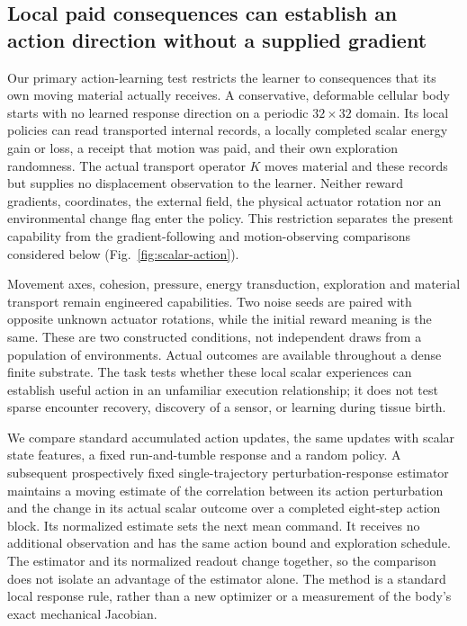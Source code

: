 \subsection*{Local paid consequences can establish an action direction without a supplied gradient}

Our primary action-learning test restricts the learner to consequences that its own moving material actually receives. A conservative, deformable cellular body starts with no learned response direction on a periodic $32\times32$ domain. Its local policies can read transported internal records, a locally completed scalar energy gain or loss, a receipt that motion was paid, and their own exploration randomness. The actual transport operator $K$ moves material and these records but supplies no displacement observation to the learner. Neither reward gradients, coordinates, the external field, the physical actuator rotation nor an environmental change flag enter the policy. This restriction separates the present capability from the gradient-following and motion-observing comparisons considered below (Fig.~\ref{fig:scalar-action}).

Movement axes, cohesion, pressure, energy transduction, exploration and material transport remain engineered capabilities. Two noise seeds are paired with opposite unknown actuator rotations, while the initial reward meaning is the same. These are two constructed conditions, not independent draws from a population of environments. Actual outcomes are available throughout a dense finite substrate. The task tests whether these local scalar experiences can establish useful action in an unfamiliar execution relationship; it does not test sparse encounter recovery, discovery of a sensor, or learning during tissue birth.

We compare standard accumulated action updates, the same updates with scalar state features, a fixed run-and-tumble response and a random policy. A subsequent prospectively fixed single-trajectory perturbation-response estimator maintains a moving estimate of the correlation between its action perturbation and the change in its actual scalar outcome over a completed eight-step action block. Its normalized estimate sets the next mean command. It receives no additional observation and has the same action bound and exploration schedule. The estimator and its normalized readout change together, so the comparison does not isolate an advantage of the estimator alone. The method is a standard local response rule, rather than a new optimizer or a measurement of the body's exact mechanical Jacobian.

